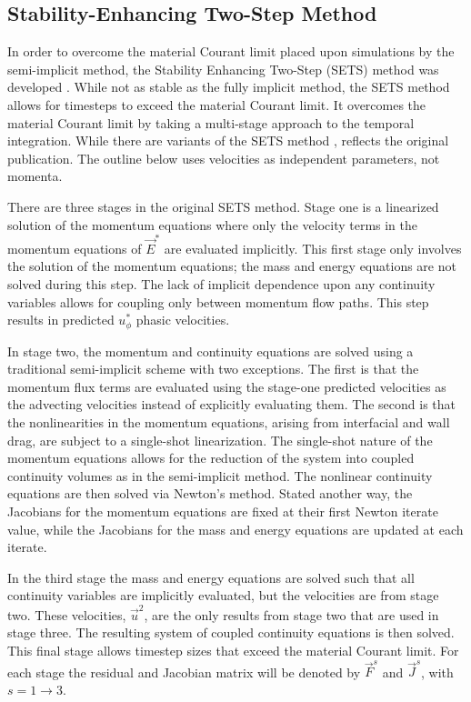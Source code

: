 \subsection{Stability-Enhancing Two-Step Method} 
\label{subsect:numerics_sets}
In order to overcome the material Courant limit placed upon simulations by the semi-implicit method, the Stability Enhancing Two-Step (SETS) method was developed \cite{Mahaffy1982}.
While not as stable as the fully implicit method, the SETS method allows for timesteps to exceed the material Courant limit.
It overcomes the material Courant limit by taking a multi-stage approach to the temporal integration.
While there are variants of the SETS method \cite{TRACE},  reflects the original publication.
The outline below uses velocities as independent parameters, not momenta.

There are three stages in the original SETS method.
Stage one is a linearized solution of the momentum equations where only the velocity terms in the momentum equations of $\vec{E}^{*}$ are evaluated implicitly.
This first stage only involves the solution of the momentum equations; the mass and energy equations are not solved during this step.
The lack of implicit dependence upon any continuity variables allows for coupling only between momentum flow paths.
This step results in predicted $u^{*}_{\phi}$ phasic velocities.

In stage two, the momentum and continuity equations are solved using a traditional semi-implicit scheme with two exceptions.
The first is that the momentum flux terms are evaluated using the stage-one predicted velocities as the advecting velocities instead of explicitly evaluating them.
The second is that the nonlinearities in the momentum equations, arising from interfacial and wall drag, are subject to a single-shot linearization.
The single-shot nature of the momentum equations allows for the reduction of the system into coupled continuity volumes as in the semi-implicit method.
The nonlinear continuity equations are then solved via Newton's method.
Stated another way, the Jacobians for the momentum equations are fixed at their first Newton iterate value, while the Jacobians for the mass and energy equations are updated at each iterate.

In the third stage the mass and energy equations are solved such that all continuity variables are implicitly evaluated, but the velocities are from stage two.
These velocities, $\vec{u}^{2}$, are the only results from stage two that are used in stage three. 
The resulting system of coupled continuity equations is then solved.
This final stage allows timestep sizes that exceed the material Courant limit.
For each stage the residual and Jacobian matrix will be denoted by $\vec{F}^{s}$ and $\vec{J}^{s}$, with $s = 1 \to 3$.

